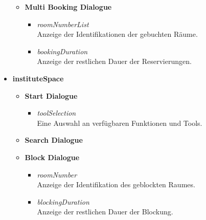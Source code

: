 \begin{itemize}[noitemsep]
\begin{itemize}
\begin{itemize}
		\end{itemize}
		\item \textbf{Multi Booking Dialogue}
		\begin{itemize}
			\item \textit{roomNumberList}\\Anzeige der Identifikationen der gebuchten Räume.
			\item \textit{bookingDuration}\\Anzeige der restlichen Dauer der Reservierungen.
		\end{itemize}
	\end{itemize}
	
	\item \textbf{instituteSpace}
	\begin{itemize}
		\item \textbf{Start Dialogue}
		\begin{itemize}
			\item \textit{toolSelection}\\Eine Auswahl an verfügbaren Funktionen und Tools.
		\end{itemize}
		\item \textbf{Search Dialogue}
		\item \textbf{Block Dialogue}
		\begin{itemize}
			\item \textit{roomNumber}\\Anzeige der Identifikation des geblockten Raumes.
			\item \textit{blockingDuration}\\Anzeige der restlichen Dauer der Blockung.
		\end{itemize}
	\end{itemize}
	

\end{itemize}
